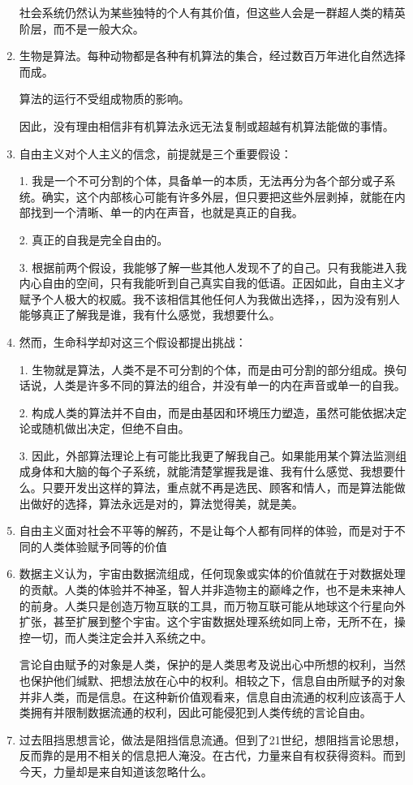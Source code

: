 \documentclass[UTF8]{ctexart}
\begin{document}
\begin{enumerate}
			社会系统仍然认为某些独特的个人有其价值，但这些人会是一群超人类的精英阶层，而不是一般大众。
			\item  生物是算法。每种动物都是各种有机算法的集合，经过数百万年进化自然选择而成。
			
			算法的运行不受组成物质的影响。
			
			因此，没有理由相信非有机算法永远无法复制或超越有机算法能做的事情。
			\item 自由主义对个人主义的信念，前提就是三个重要假设：
			
			1. 我是一个不可分割的个体，具备单一的本质，无法再分为各个部分或子系统。确实，这个内部核心可能有许多外层，但只要把这些外层剥掉，就能在内部找到一个清晰、单一的内在声音，也就是真正的自我。
			
			2. 真正的自我是完全自由的。
			
			3. 根据前两个假设，我能够了解一些其他人发现不了的自己。只有我能进入我内心自由的空间，只有我能听到自己真实自我的低语。正因如此，自由主义才赋予个人极大的权威。我不该相信其他任何人为我做出选择，，因为没有别人能够真正了解我是谁，我有什么感觉，我想要什么。
			\item  然而，生命科学却对这三个假设都提出挑战：
			
			1. 生物就是算法，人类不是不可分割的个体，而是由可分割的部分组成。换句话说，人类是许多不同的算法的组合，并没有单一的内在声音或单一的自我。
			
			2. 构成人类的算法并不自由，而是由基因和环境压力塑造，虽然可能依据决定论或随机做出决定，但绝不自由。
			
			3. 因此，外部算法理论上有可能比我更了解我自己。如果能用某个算法监测组成身体和大脑的每个子系统，就能清楚掌握我是谁、我有什么感觉、我想要什么。只要开发出这样的算法，重点就不再是选民、顾客和情人，而是算法能做出做好的选择，算法永远是对的，算法觉得美，就是美。
			
			\item 自由主义面对社会不平等的解药，不是让每个人都有同样的体验，而是对于不同的人类体验赋予同等的价值
			\item 数据主义认为，宇宙由数据流组成，任何现象或实体的价值就在于对数据处理的贡献。人类的体验并不神圣，智人并非造物主的巅峰之作，也不是未来神人的前身。人类只是创造万物互联的工具，而万物互联可能从地球这个行星向外扩张，甚至扩展到整个宇宙。这个宇宙数据处理系统如同上帝，无所不在，操控一切，而人类注定会并入系统之中。
			
			言论自由赋予的对象是人类，保护的是人类思考及说出心中所想的权利，当然也保护他们缄默、把想法放在心中的权利。相较之下，信息自由所赋予的对象并非人类，而是信息。在这种新价值观看来，信息自由流通的权利应该高于人类拥有并限制数据流通的权利，因此可能侵犯到人类传统的言论自由。
			
			\item 过去阻挡思想言论，做法是阻挡信息流通。但到了21世纪，想阻挡言论思想，反而靠的是用不相关的信息把人淹没。在古代，力量来自有权获得资料。而到今天，力量却是来自知道该忽略什么。
			
			
		\end{enumerate}	
	\newpage
	
\end{document}
